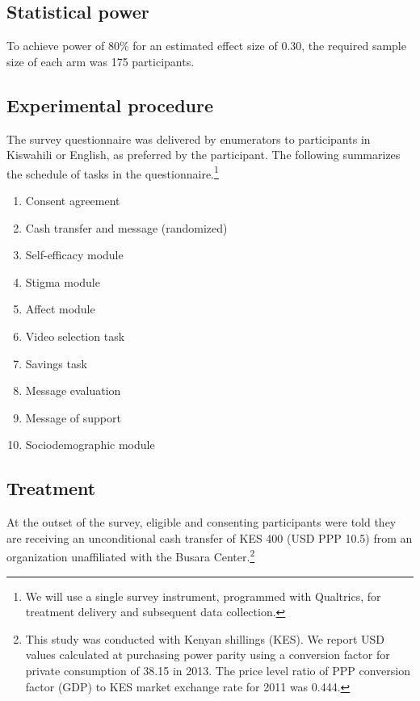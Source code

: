 \documentclass[11pt, a4paper]{article}\usepackage[]{graphicx}\usepackage[]{color}
\begin{document}
    \subsection{Statistical power}

        To achieve power of 80\% for an estimated effect size of 0.30, the required sample size of each arm was 175 participants.

    \subsection{Experimental procedure}

        The survey questionnaire was delivered by enumerators to participants in Kiswahili or English, as preferred by the participant. The following summarizes the schedule of tasks in the questionnaire.\footnote{We will use a single survey instrument, programmed with Qualtrics, for treatment delivery and subsequent data collection.}

        \begin{enumerate}
        \itemsep0em 
            \item Consent agreement
            \item Cash transfer and message (randomized)
            \item Self-efficacy module
            \item Stigma module
            \item Affect module
            \item Video selection task
            \item Savings task
            \item Message evaluation
            \item Message of support
            \item Sociodemographic module
        \end{enumerate}

    \subsection{Treatment}

        At the outset of the survey, eligible and consenting participants were told they are receiving an unconditional cash transfer of KES 400 (USD PPP 10.5) from an organization unaffiliated with the Busara Center.\footnote{This study was conducted with Kenyan shillings (KES). We report USD values calculated at purchasing power parity using a conversion factor for private consumption of 38.15 in 2013. The price level ratio of PPP conversion factor (GDP) to KES market exchange rate for 2011 was 0.444.} \\
        
\end{document}
